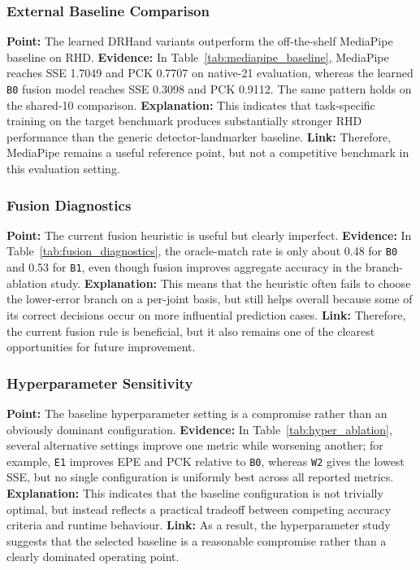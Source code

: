 \documentclass[10pt,letterpaper]{article}
\begin{document}
\subsubsection{External Baseline Comparison}

\medskip
\noindent\textbf{Point:} The learned DRHand variants outperform the off-the-shelf MediaPipe baseline on RHD.  
\textbf{Evidence:} In Table~\ref{tab:mediapipe_baseline}, MediaPipe reaches SSE 1.7049 and PCK 0.7707 on native-21 evaluation, whereas the learned \texttt{B0} fusion model reaches SSE 0.3098 and PCK 0.9112. The same pattern holds on the shared-10 comparison.  
\textbf{Explanation:} This indicates that task-specific training on the target benchmark produces substantially stronger RHD performance than the generic detector-landmarker baseline.  
\textbf{Link:} Therefore, MediaPipe remains a useful reference point, but not a competitive benchmark in this evaluation setting.

\subsubsection{Fusion Diagnostics}

\medskip
\noindent\textbf{Point:} The current fusion heuristic is useful but clearly imperfect.  
\textbf{Evidence:} In Table~\ref{tab:fusion_diagnostics}, the oracle-match rate is only about 0.48 for \texttt{B0} and 0.53 for \texttt{B1}, even though fusion improves aggregate accuracy in the branch-ablation study.  
\textbf{Explanation:} This means that the heuristic often fails to choose the lower-error branch on a per-joint basis, but still helps overall because some of its correct decisions occur on more influential prediction cases.  
\textbf{Link:} Therefore, the current fusion rule is beneficial, but it also remains one of the clearest opportunities for future improvement.

\subsubsection{Hyperparameter Sensitivity}

\medskip
\noindent\textbf{Point:} The baseline hyperparameter setting is a compromise rather than an obviously dominant configuration.  
\textbf{Evidence:} In Table~\ref{tab:hyper_ablation}, several alternative settings improve one metric while worsening another; for example, \texttt{E1} improves EPE and PCK relative to \texttt{B0}, whereas \texttt{W2} gives the lowest SSE, but no single configuration is uniformly best across all reported metrics.  
\textbf{Explanation:} This indicates that the baseline configuration is not trivially optimal, but instead reflects a practical tradeoff between competing accuracy criteria and runtime behaviour.  
\textbf{Link:} As a result, the hyperparameter study suggests that the selected baseline is a reasonable compromise rather than a clearly dominated operating point.
\end{document}
